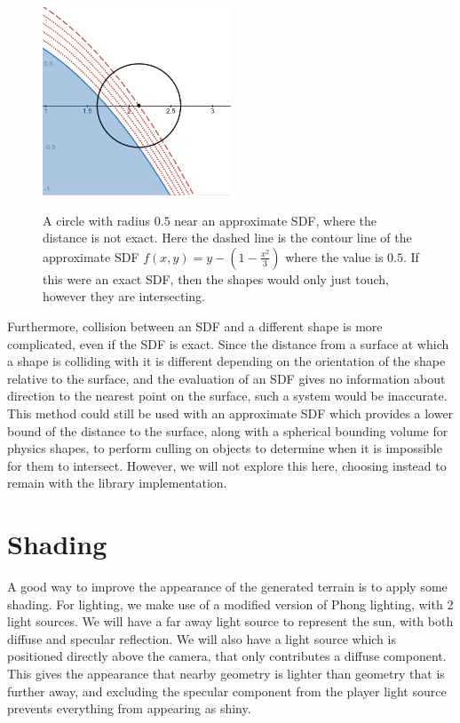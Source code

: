 \documentclass[11pt]{article}
\begin{document}
\begin{figure}
  \caption{A circle with radius $0.5$ near an approximate SDF, where the distance is not exact. Here the dashed line is the contour line of the approximate SDF $f\left(x,y\right) = y - \left(1 - \frac{x^2}{3}\right)$ where the value is $0.5$. If this were an exact SDF, then the shapes would only just touch, however they are intersecting.}
  \includegraphics[width=0.5\textwidth]{approx_collision}
  \label{fig:approx_collision}
\end{figure}

Furthermore, collision between an SDF and a different shape is more complicated, even if the SDF is exact. Since the distance from a surface at which a shape is colliding with it is different depending on the orientation of the shape relative to the surface, and the evaluation of an SDF gives no information about direction to the nearest point on the surface, such a system would be inaccurate. This method could still be used with an approximate SDF which provides a lower bound of the distance to the surface, along with a spherical bounding volume for physics shapes, to perform culling on objects to determine when it is impossible for them to intersect. However, we will not explore this here, choosing instead to remain with the library implementation.  

\section{Shading}
A good way to improve the appearance of the generated terrain is to apply some shading. For lighting, we make use of a modified version of Phong lighting, with 2 light sources. We will have a far away light source to represent the sun, with both diffuse and specular reflection. We will also have a light source which is positioned directly above the camera, that only contributes a diffuse component. This gives the appearance that nearby geometry is lighter than geometry that is further away, and excluding the specular component from the player light source prevents everything from appearing as shiny.
\end{document}

